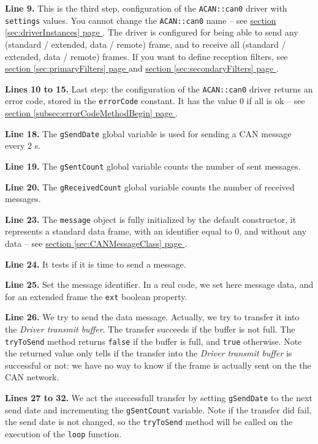 \documentclass[10pt, a4paper, obeyspaces, openany]{extarticle}
\newcommand\refSectionPage[1]{\hyperref[sec:#1]{section \ref*{sec:#1} page \pageref{sec:#1}}}
\newcommand\refSubsectionPage[1]{\hyperref[subsec:#1]{section \ref*{subsec:#1} page \pageref{subsec:#1}}}
\begin{document}
{\bf Line 9.} This is the third step, configuration of the \texttt{ACAN::can0} driver with \texttt{settings} values. You cannot change the \texttt{ACAN::can0} name -- see \refSectionPage{driverInstances}. The driver is configured for being able to send any (standard / extended, data / remote) frame, and to receive all (standard / extended, data / remote) frames. If you want to define reception filters, see \refSectionPage{primaryFilters} and  \refSectionPage{secondaryFilters}.

{\bf Lines 10 to 15.} Last step: the configuration of the \texttt{ACAN::can0} driver returns an error code, stored in the \texttt{errorCode} constant. It has the value $0$ if all is ok -- see \refSubsectionPage{errorCodeMethodBegin}.

{\bf Line 18.} The \texttt{gSendDate} global variable is used for sending a CAN message every 2 s.

{\bf Line 19.} The \texttt{gSentCount} global variable counts the number of sent messages.

{\bf Line 20.} The \texttt{gReceivedCount} global variable counts the number of received messages.


{\bf Line 23.} The \texttt{message} object is fully initialized by the default constructor, it represents a standard data frame, with an identifier equal to $0$, and without any data -- see \refSectionPage{CANMessageClass}. 

{\bf Line 24.} It tests if it is time to send a message.

{\bf Line 25.} Set the message identifier. In a real code, we set here message data, and for an extended frame the \texttt{ext} boolean property.

{\bf Line 26.} We try to send the data message. Actually, we try to transfer it into the \emph{Driver transmit buffer}. The transfer succeeds if the buffer is not full. The \texttt{tryToSend} method returns \texttt{false} if the buffer is full, and \texttt{true} otherwise. Note the returned value only tells if the transfer into the \emph{Driver transmit buffer} is successful or not: we have no way to know if the frame is actually sent on the the CAN network.

{\bf Lines 27 to 32.} We act the successfull transfer by setting \texttt{gSendDate} to the next send date and incrementing the \texttt{gSentCount} variable. Note if the transfer did fail, the send date is not changed, so the \texttt{tryToSend} method will be called on the execution of the \texttt{loop} function.
\end{document}
